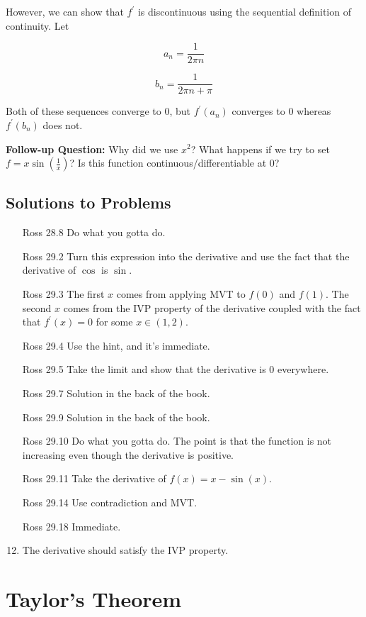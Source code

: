 \documentclass{article}
\theoremstyle{definition}
\newcommand{\fdiff}{f^{\prime}}
\begin{document}
However, we can show that $\fdiff$ is discontinuous using the sequential
definition of continuity. Let 

\[ a_{n} = \frac{1}{2 \pi n}\] 

\[ b_{n} = \frac{1}{2 \pi n + \pi}\] 

Both of these sequences converge to $0$, but $\fdiff(a_{n}) $ converges to 
$0$ whereas $\fdiff(b_{n})$ does not.

\textbf{Follow-up Question:} Why did we use $x^{2}$? What happens if
we try to set $f = x \sin(\frac{1}{x})$? Is this function continuous/differentiable
at $0$?

\subsection{Solutions to Problems}

\begin{enumerate}
    \item [Ross 28.8] Do what you gotta do.
    \item[Ross 29.2] Turn this expression into the derivative and use the fact that
    the derivative of $\cos$ is $\sin$.
    \item[Ross 29.3] The first $x$ comes from applying MVT to $f(0)$ and $f(1)$. The second
    $x$ comes from the IVP property of the derivative coupled with the fact that 
    $\fdiff(x) = 0$ for some $x \in (1,2)$.
    \item[Ross 29.4] Use the hint, and it's immediate.
    \item[Ross 29.5] Take the limit and show that the derivative is $0$ everywhere.
    \item[Ross 29.7] Solution in the back of the book.
    \item[Ross 29.9] Solution in the back of the book.
    \item[Ross 29.10] Do what you gotta do. The point is that the function
    is not increasing even though the derivative is positive.
    \item[Ross 29.11] Take the derivative of $f(x) = x - \sin(x)$.
    \item[Ross 29.14] Use contradiction and MVT.
    \item[Ross 29.18] Immediate.
    \item The derivative should satisfy the IVP property.
\end{enumerate}



\newpage 

\section{Taylor's Theorem}
\end{document}
